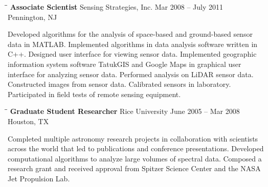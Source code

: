 \documentclass{res}
\begin{document}
\begin{resume}
   \begin{tabbing}
   \hspace{2.3in}\= \hspace{2.6in}\= \kill %
    {\bf Associate Scientist} \>Sensing Strategies, Inc.     \>Mar 2008 -- July 2011\\
                             \>Pennington, NJ
   \end{tabbing}\vspace{-20pt}      %
Developed algorithms for the analysis of space-based and ground-based sensor data in MATLAB.  Implemented algorithms in data analysis software written in C++.  Designed user interface for viewing sensor data.  Implemented geographic information system software TatukGIS and Google Maps in graphical user interface for analyzing sensor data.  Performed analysis on LiDAR sensor data.  Constructed images from sensor data.  Calibrated sensors in laboratory.  Participated in field tests of remote sensing equipment.

       
   \begin{tabbing}
   \hspace{2.3in}\= \hspace{2.6in}\= \kill %
    {\bf Graduate Student Researcher} \>Rice University     \>June 2005 -- Mar 2008\\
                             \>Houston, TX
   \end{tabbing}\vspace{-20pt}      %
Completed multiple astronomy research projects in collaboration with scientists across the world that led to publications and conference presentations.  Developed computational algorithms to analyze large volumes of spectral data.  Composed a research grant and received approval from Spitzer Science Center and the NASA Jet Propulsion Lab. 
    

\end{resume}
\end{document}

